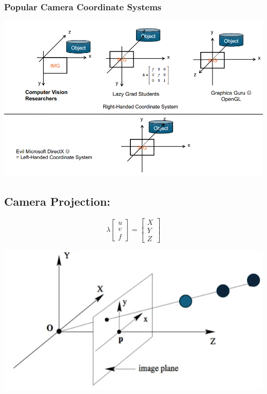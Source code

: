 \documentclass[10pt]{article}
\begin{document}
\subsubsection*{Popular Camera Coordinate Systems}
\begin{center} 
	\includegraphics*[width=\textwidth]{L1_22.png} 
\end{center}

\subsection*{Camera Projection:}
\[\lambda \begin{bmatrix} u \\ v \\ f \end{bmatrix} = \begin{bmatrix} X \\ Y \\ Z \end{bmatrix}\]
\begin{center} 
	\includegraphics*[width=\textwidth]{L1_23.png} 
\end{center}
\end{document}
